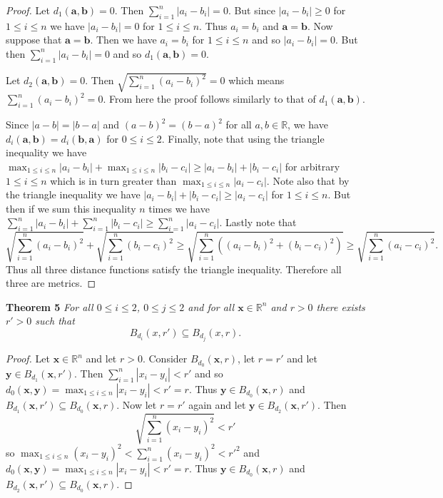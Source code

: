 \documentclass{article}
\begin{document}
\begin{flushleft}
\begin{proof}
Let $d_1(\mathbf{a},\mathbf{b}) = 0$. Then $\sum_{i=1}^{n} |a_i - b_i| = 0$. But since $|a_i - b_i| \geq 0$ for $1 \leq i \leq n$ we have $|a_i - b_i| = 0$ for $1 \leq i \leq n$. Thus $a_i = b_i$ and $\mathbf{a} = \mathbf{b}$. Now suppose that $\mathbf{a}=\mathbf{b}$. Then we have $a_i = b_i$ for $1 \leq i \leq n$ and so $|a_i - b_i| = 0$. But then $\sum_{i=1}^{n} |a_i - b_i| = 0$ and so $d_1(\mathbf{a},\mathbf{b}) = 0$.\newline

Let $d_2(\mathbf{a},\mathbf{b}) = 0$. Then $\sqrt{\sum_{i=1}^{n} (a_i-b_i)^2} = 0$ which means $\sum_{i=1}^{n} (a_i-b_i)^2 = 0$. From here the proof follows similarly to that of $d_1(\mathbf{a},\mathbf{b})$.\newline

Since $|a-b| = |b-a|$ and $(a-b)^2 = (b-a)^2$ for all $a,b \in \mathbb{R}$, we have $d_i(\mathbf{a},\mathbf{b}) = d_i(\mathbf{b},\mathbf{a})$ for $0 \leq i \leq 2$. Finally, note that using the triangle inequality we have $\max_{1 \leq i \leq n} |a_i-b_i| + \max_{1 \leq i \leq n} |b_i-c_i| \geq |a_i-b_i|+|b_i-c_i|$ for arbitrary $1 \leq i \leq n$ which is in turn greater than $\max_{1 \leq i \leq n} |a_i - c_i|$. Note also that by the triangle inequality we have $|a_i - b_i| + |b_i - c_i| \geq |a_i - c_i|$ for $1 \leq i \leq n$. But then if we sum this inequality $n$ times we have $\sum_{i=1}^n |a_i - b_i| + \sum_{i=1}^n |b_i - c_i| \geq \sum_{i=1}^n |a_i-c_i|$. Lastly note that
\[
\sqrt{\sum_{i=1}^n (a_i-b_i)^2} + \sqrt{\sum_{i=1}^n (b_i-c_i)^2} \geq \sqrt{\sum_{i=1}^n \left ( (a_i-b_i)^2 + (b_i-c_i)^2 \right ) } \geq \sqrt{\sum_{i=1}^n (a_i-c_i)^2}.
\]
Thus all three distance functions satisfy the triangle inequality. Therefore all three are metrics.
\end{proof}

\textbf{Theorem 5}
\textsl{For all $0 \leq i \leq 2$, $0 \leq j \leq 2$ and for all $\mathbf x \in \mathbb{R}^n$ and $r>0$ there exists $r'>0$ such that
\[
B_{d_i} (x, r') \subseteq B_{d_j} (x,r).
\]}
\begin{proof}
Let $\mathbf x \in \mathbb{R}^n$ and let $r>0$. Consider $B_{d_0}(\mathbf x, r)$, let $r = r'$ and let $\mathbf y \in B_{d_1}(\mathbf x, r')$. Then $\sum_{i=1}^n |x_i - y_i| < r'$ and so $d_0(\mathbf x, \mathbf y) = \max_{1 \leq i \leq n} |x_i - y_i| < r' = r$. Thus $\mathbf y \in B_{d_0}(\mathbf x, r)$ and $B_{d_1}(\mathbf x, r') \subseteq B_{d_0}(\mathbf x, r)$. Now let $r=r'$ again and let $\mathbf y \in B_{d_2}(\mathbf x, r')$. Then
\[
\sqrt{\sum_{i=1}^n (x_i - y_i)^2} < r'
\]
so $\max_{1 \leq i \leq n} (x_i - y_i)^2 < \sum_{i=1}^n (x_i - y_i)^2 < r'^2$ and $d_0(\mathbf x, \mathbf y) = \max_{1 \leq i \leq n} |x_i - y_i| < r' = r$. Thus $\mathbf y \in B_{d_0}(\mathbf x, r)$ and $B_{d_2}(\mathbf x, r') \subseteq B_{d_0}(\mathbf x, r)$.\newline


\end{proof}
\end{flushleft}
\end{document}
